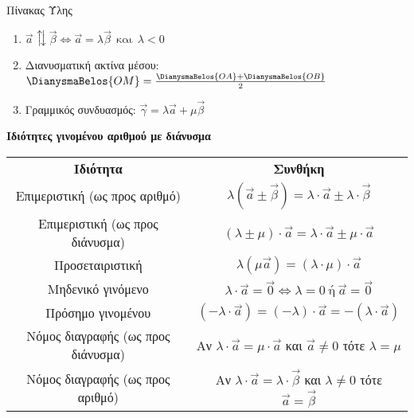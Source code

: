 \documentclass[internet]{frontisthrio}
\begin{document}
\begin{mybox}[mysubtitle]{Πίνακας Ύλης}
\begin{multicols}{2}
\begin{enumerate}[itemsep=0mm]
\item $\vec{a}\updownarrows\vec{\beta}\Leftrightarrow \vec{a}=\lambda\vec{\beta}\ \ \textrm{και}\ \ \lambda<0$
\item Διανυσματική ακτίνα μέσου:\\$\DianysmaBelos{OM}=\frac{\DianysmaBelos{OA}+\DianysmaBelos{OB}}{2}$
\item Γραμμικός συνδυασμός: $\vec{\gamma}=\lambda\vec{a}+\mu\vec{\beta}$
\end{enumerate}
\end{multicols}
\begin{center}
\textbf{Ιδιότητες γινομένου αριθμού με διάνυσμα}\\
\begin{longtable}{cc}
\hline \rule[-2ex]{0pt}{5.5ex} \textbf{Ιδιότητα} & \textbf{Συνθήκη} \\ 
\hhline{==} \rule[-2ex]{0pt}{5.5ex} Επιμεριστική (ως προς αριθμό) & $ \lambda\left( \vec{a}\pm\vec{\beta}\right)=\lambda\cdot\vec{a}\pm\lambda\cdot\vec{\beta} $ \\ 
\rule[-2ex]{0pt}{5.5ex} Επιμεριστική (ως προς διάνυσμα) & $ \left( \lambda\pm\mu\right)\cdot\vec{a}=\lambda\cdot\vec{a}\pm\mu\cdot\vec{a} $ \\
\rule[-2ex]{0pt}{5.5ex} Προσεταιριστική & $ \lambda\left( \mu\vec{a}\right)=\left( \lambda\cdot\mu\right)\cdot\vec{a} $ \\ 
\rule[-2ex]{0pt}{5.5ex} Μηδενικό γινόμενο & $ \lambda\cdot\vec{a}=\vec{0}\Leftrightarrow \lambda=0 \ \textrm{ή}\ \vec{a}=\vec{0} $ \\ 
\rule[-2ex]{0pt}{5.5ex} Πρόσημο γινομένου & $ \left( -\lambda\cdot\vec{a}\right)=(-\lambda)\cdot\vec{a}=-\left( \lambda\cdot\vec{a}\right)  $ \\ 
\rule[-2ex]{0pt}{5.5ex} Νόμος διαγραφής (ως προς διάνυσμα) & Αν $ \lambda\cdot\vec{a}=\mu\cdot\vec{a} $ και $ \vec{a}\neq0 $ τότε $ \lambda=\mu $ \\ 
\rule[-2ex]{0pt}{5.5ex} Νόμος διαγραφής (ως προς αριθμό) & Αν $ \lambda\cdot\vec{a}=\lambda\cdot\vec{\beta} $ και $ \lambda\neq0 $ τότε $ \vec{a}=\vec{\beta} $\\ 
\hline 
\end{longtable}
\end{center} 
\end{mybox}
\newpage
\end{document}
